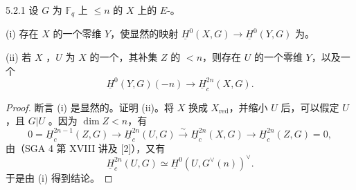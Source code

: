 \begin{SGAresult}{}{5.2.1}
设 $G$ 为 $\mathbb F_q$ 上 $\leq n$ 的 $X$ 上的 $E$-。

\textup{(i)} 存在 $X$ 的一个零维 $Y$，使显然的映射 $\underline H^0(X,G)\to\underline H^0(Y,G)$ 为。

\textup{(ii)} 若 $X$ ，$U$ 为 $X$ 的一个，其补集 $Z$ 的 $<n$，则存在 $U$ 的一个零维 $Y$，以及一个
\[
\underline H^0(Y,G)(-n)\longrightarrow\underline H_c^{2n}(X,G).
\]
\end{SGAresult}
\begin{proof}
断言 (i) 是显然的。证明 (ii)。将 $X$ 换成 $X_{\mathrm{red}}$，并缩小 $U$ 后，可以假定 $U$ ，且 $G|U$ 。因为 $\dim Z<n$，有
\[
0=\underline H_c^{2n-1}(Z,G)\longrightarrow
\underline H_c^{2n}(U,G)\xrightarrow{\sim}
\underline H_c^{2n}(X,G)\longrightarrow
\underline H_c^{2n}(Z,G)=0,
\]
由（SGA 4 第 XVIII 讲及 [2]），又有
\[
\underline H_c^{2n}(U,G)\simeq\underline H^0(U,G^\vee(n))^\vee.
\]
于是由 (i) 得到结论。
\end{proof}

